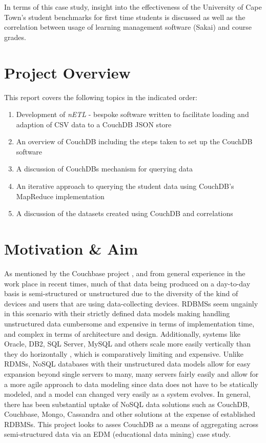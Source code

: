 In terms of this case study, insight into the effectiveness of the University of Cape Town's student benchmarks for first time students is discussed as well as the correlation between usage of learning management software (Sakai) and course grades.

\section{Project Overview}
This report covers the following topics in the indicated order:

\begin{enumerate}
    \item Development of \textit{nETL} - bespoke software written to facilitate loading and adaption of CSV data to a CouchDB JSON store
    \item An overview of CouchDB including the steps taken to set up the CouchDB software
    \item A discussion of CouchDBs mechanism for querying data
    \item An iterative approach to querying the student data using CouchDB's MapReduce implementation
    \item A discussion of the datasets created using CouchDB and correlations
\end{enumerate}

\section{Motivation \& Aim}
As mentioned by the  Couchbase project \cite{couchbaseWhitePaper}, and from general experience in the work place in recent times, much of that data being produced on a day-to-day basis is semi-structured or unstructured due to the diversity of the kind of devices and users that are using data-collecting devices. RDBMSs seem ungainly in this scenario with their strictly defined data models making handling unstructured data cumbersome and expensive in terms of implementation time, and complex in terms of architecture and design. Additionally, systems like Oracle, DB2, SQL Server, MySQL and others scale more easily vertically than they do horizontally \cite{couchbaseWhitePaper}, which is comparatively limiting and expensive. Unlike RDMSs, NoSQL databases with their unstructured data models allow for easy expansion beyond single servers to many, many servers fairly easily and allow for a more agile approach to data modeling since data does not have to be statically modeled, and a model can changed very easily as a system evolves. In general, there has been substantial uptake of NoSQL data solutions such as CouchDB, Couchbase, Mongo, Cassandra and other solutions at the expense of established RDBMSs. This project looks to asses CouchDB as a means of aggregating across semi-structured data via an EDM (educational data mining) case study.

